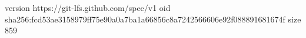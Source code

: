 version https://git-lfs.github.com/spec/v1
oid sha256:fcd53ae3158979ff75e90a0a7ba1a66856c8a7242566606e92f088891681674f
size 859

